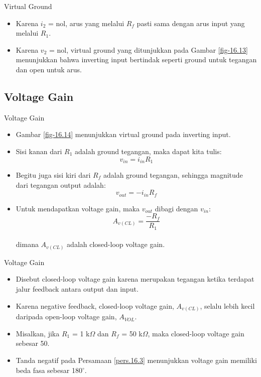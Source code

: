 \begin{frame}[t]{Virtual Ground}
	\begin{itemize}
		\item Karena $ i_2 $ = nol, arus yang melalui $ R_f $ pasti sama dengan arus input yang melalui $ R_1 $.
		\item Karena $ v_2 $ = nol, virtual ground yang ditunjukkan pada Gambar \ref{fig-16.13} menunjukkan bahwa inverting input bertindak seperti ground untuk tegangan dan open untuk arus.
	\end{itemize}
\end{frame}

\subsection{Voltage Gain}

\begin{frame}[t]{Voltage Gain}
	\begin{itemize}
		\item Gambar \ref{fig-16.14} menunjukkan virtual ground pada inverting input.
		\item Sisi kanan dari $ R_1 $ adalah ground tegangan, maka dapat kita tulis:\\
		$$ v_{in} = i_{in} R_1 $$
		\item Begitu juga sisi kiri dari $ R_f $ adalah ground tegangan, sehingga magnitude dari tegangan output adalah:\\
		$$ v_{out} = -i_{in} R_f $$
		\item Untuk mendapatkan voltage gain, maka $ v_{out} $ dibagi dengan $ v_{in} $:
		\begin{equation}\label{pers.16.3}
			A_{v(CL)} = \frac{-R_f}{R_1}
		\end{equation}\\
		dimana $ A_{v(CL)} $ adalah closed-loop voltage gain.
	\end{itemize}
\end{frame}

\begin{frame}[t]{Voltage Gain}
	\begin{itemize}
		\item Disebut closed-loop voltage gain karena merupakan tegangan ketika terdapat jalur feedback antara output dan input.
		\item Karena negative feedback, closed-loop voltage gain, $ A_{v(CL)} $, selalu lebih kecil daripada open-loop voltage gain, $ A_{VOL} $.
		\item Misalkan, jika $ R_1 $ = 1 k$\Omega$ dan $ R_f $ = 50 k$\Omega$, maka closed-loop voltage gain sebesar 50.
		\item Tanda negatif pada Persamaan \ref{pers.16.3} menunjukkan voltage gain memiliki beda fasa sebesar 180$ ^\circ $.
	\end{itemize}
\end{frame}

